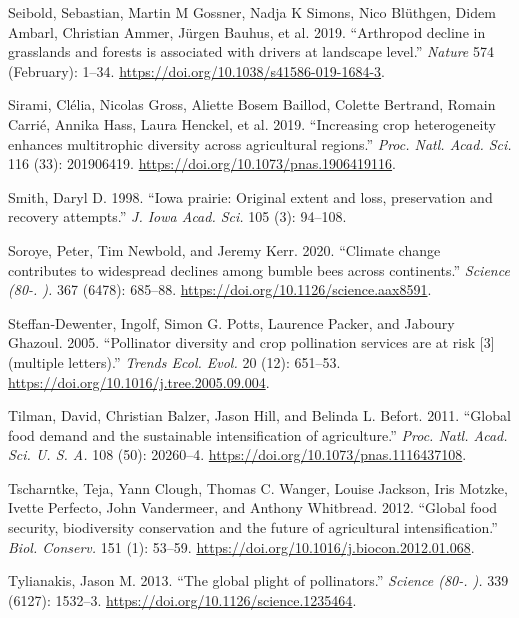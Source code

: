 \documentclass[11pt,]{article}
\begin{document}
\leavevmode\hypertarget{ref-Seibold2019}{}%
Seibold, Sebastian, Martin M Gossner, Nadja K Simons, Nico Blüthgen,
Didem Ambarl, Christian Ammer, Jürgen Bauhus, et al. 2019. ``Arthropod
decline in grasslands and forests is associated with drivers at
landscape level.'' \emph{Nature} 574 (February): 1--34.
\url{https://doi.org/10.1038/s41586-019-1684-3}.

\leavevmode\hypertarget{ref-Sirami2019}{}%
Sirami, Clélia, Nicolas Gross, Aliette Bosem Baillod, Colette Bertrand,
Romain Carrié, Annika Hass, Laura Henckel, et al. 2019. ``Increasing
crop heterogeneity enhances multitrophic diversity across agricultural
regions.'' \emph{Proc. Natl. Acad. Sci.} 116 (33): 201906419.
\url{https://doi.org/10.1073/pnas.1906419116}.

\leavevmode\hypertarget{ref-Smith1998}{}%
Smith, Daryl D. 1998. ``Iowa prairie: Original extent and loss,
preservation and recovery attempts.'' \emph{J. Iowa Acad. Sci.} 105 (3):
94--108.

\leavevmode\hypertarget{ref-Soroye2020}{}%
Soroye, Peter, Tim Newbold, and Jeremy Kerr. 2020. ``Climate change
contributes to widespread declines among bumble bees across
continents.'' \emph{Science (80-. ).} 367 (6478): 685--88.
\url{https://doi.org/10.1126/science.aax8591}.

\leavevmode\hypertarget{ref-Steffan-Dewenter2005c}{}%
Steffan-Dewenter, Ingolf, Simon G. Potts, Laurence Packer, and Jaboury
Ghazoul. 2005. ``Pollinator diversity and crop pollination services are
at risk {[}3{]} (multiple letters).'' \emph{Trends Ecol. Evol.} 20 (12):
651--53. \url{https://doi.org/10.1016/j.tree.2005.09.004}.

\leavevmode\hypertarget{ref-Tilman2011}{}%
Tilman, David, Christian Balzer, Jason Hill, and Belinda L. Befort.
2011. ``Global food demand and the sustainable intensification of
agriculture.'' \emph{Proc. Natl. Acad. Sci. U. S. A.} 108 (50):
20260--4. \url{https://doi.org/10.1073/pnas.1116437108}.

\leavevmode\hypertarget{ref-Tscharntke2012}{}%
Tscharntke, Teja, Yann Clough, Thomas C. Wanger, Louise Jackson, Iris
Motzke, Ivette Perfecto, John Vandermeer, and Anthony Whitbread. 2012.
``Global food security, biodiversity conservation and the future of
agricultural intensification.'' \emph{Biol. Conserv.} 151 (1): 53--59.
\url{https://doi.org/10.1016/j.biocon.2012.01.068}.

\leavevmode\hypertarget{ref-Tylianakis2013a}{}%
Tylianakis, Jason M. 2013. ``The global plight of pollinators.''
\emph{Science (80-. ).} 339 (6127): 1532--3.
\url{https://doi.org/10.1126/science.1235464}.
\end{document}
